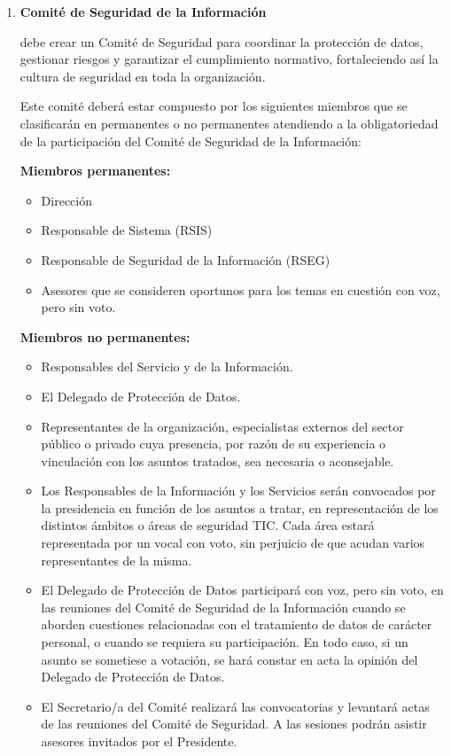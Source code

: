 \begin{enumerate}[label=\alph*)]
\item \textbf{Comité de Seguridad de la Información}

\Beneficiario{} debe crear un Comité de Seguridad para coordinar la protección de datos, gestionar riesgos y garantizar el cumplimiento normativo, fortaleciendo así la cultura de seguridad en toda la organización.

Este comité deberá estar compuesto por los siguientes miembros que se clasificarán en permanentes o no permanentes atendiendo a la obligatoriedad de la participación del Comité de Seguridad de la Información:

\textbf{Miembros permanentes:}
\begin{itemize}
  \item Dirección
  \item Responsable de Sistema (RSIS)
  \item Responsable de Seguridad de la Información (RSEG)
  \item Asesores que se consideren oportunos para los temas en cuestión con voz, pero sin voto.
\end{itemize}

\textbf{Miembros no permanentes:}
\begin{itemize}
  \item Responsables del Servicio y de la Información.
  \item El Delegado de Protección de Datos.
  \item Representantes de la organización, especialistas externos del sector público o privado cuya presencia, por razón de su experiencia o vinculación con los asuntos tratados, sea necesaria o aconsejable.
  \item Los Responsables de la Información y los Servicios serán convocados por la presidencia en función de los asuntos a tratar, en representación de los distintos ámbitos o áreas de seguridad TIC. Cada área estará representada por un vocal con voto, sin perjuicio de que acudan varios representantes de la misma.
  \item El Delegado de Protección de Datos participará con voz, pero sin voto, en las reuniones del Comité de Seguridad de la Información cuando se aborden cuestiones relacionadas con el tratamiento de datos de carácter personal, o cuando se requiera su participación. En todo caso, si un asunto se sometiese a votación, se hará constar en acta la opinión del Delegado de Protección de Datos.
  \item El Secretario/a del Comité realizará las convocatorias y levantará actas de las reuniones del Comité de Seguridad. A las sesiones podrán asistir asesores invitados por el Presidente.
\end{itemize}


\end{enumerate}
